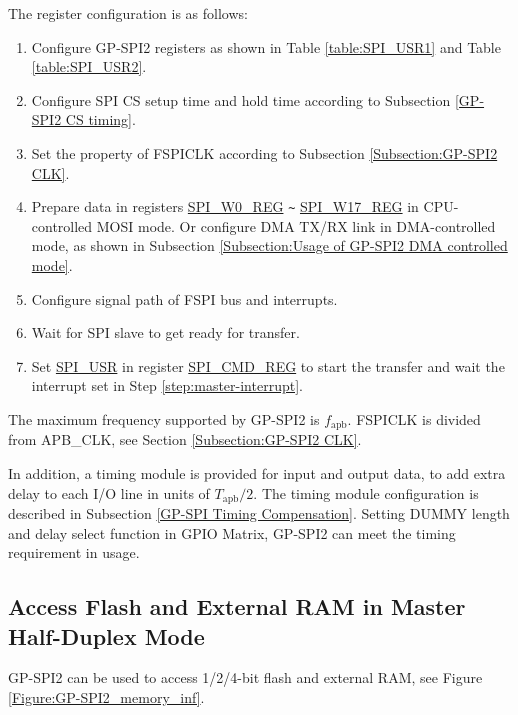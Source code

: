 \documentclass[main\_\_EN.tex]{subfiles}
\begin{document}
The register configuration is as follows:
\begin{enumerate}
    \item Configure GP-SPI2 registers as shown in Table \ref{table:SPI_USR1} and Table \ref{table:SPI_USR2}.

    \item Configure SPI CS setup time and hold time according to Subsection \ref{GP-SPI2 CS timing}.

    \item Set the property of FSPICLK according to Subsection \ref{Subsection:GP-SPI2 CLK}.

    \item Prepare data in registers \hyperref[regdesc:SPIW0REG]{SPI\_W0\_REG} \verb+~+ \hyperref[regdesc:SPIW17REG]{SPI\_W17\_REG} in CPU-controlled MOSI mode. Or configure DMA TX/RX link in DMA-controlled mode, as shown in Subsection \ref{Subsection:Usage of GP-SPI2 DMA controlled mode}.

    \item Configure signal path of FSPI bus and interrupts. \label{step:master-interrupt}

    \item Wait for SPI slave to get ready for transfer.

    \item Set \hyperref[fielddesc:SPIUSR]{SPI\_USR} in register \hyperref[regdesc:SPICMDREG]{SPI\_CMD\_REG} to start the transfer and wait the interrupt set in Step \ref{step:master-interrupt}.
\end{enumerate}

The maximum frequency supported by GP-SPI2 is $f_{\textrm{apb}}$. FSPICLK is divided from APB\_CLK, see Section \ref{Subsection:GP-SPI2 CLK}.

In addition, a timing module is provided for input and output data, to add extra delay to each I/O line in units of $T_{\textrm{apb}}/2$. The timing module configuration is described in Subsection \ref{GP-SPI Timing Compensation}. Setting DUMMY length and delay select function in GPIO Matrix, GP-SPI2 can meet the timing requirement in usage.


\subsection{Access Flash and External RAM in Master Half-Duplex Mode}
\label{GP-SPI2 access flash and external RAM}

GP-SPI2 can be used to access 1/2/4-bit flash and external RAM, see Figure \ref{Figure:GP-SPI2_memory_inf}.
\end{document}
